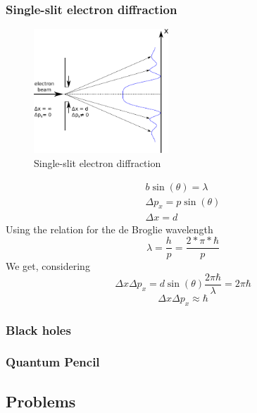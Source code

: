		\subsubsection{Single-slit electron diffraction}
			\begin{figure}[!h]
				\centering
				\includegraphics[width=0.45\textwidth]{./figs/ElectronDiffraction.eps}
				\caption{Single-slit electron diffraction}
				\label{electrondiffrac}
			\end{figure}
			
			\begin{align}
				b \sin(\theta) = \lambda \\
				\Delta p_x = p \sin(\theta) \\
				\Delta x = d
			\end{align}
			Using the relation for the de Broglie wavelength
			\begin{equation}
				\lambda = \frac{h}{p} = \frac{2*\pi *\hbar}{p}
			\end{equation}
			We get, considering
			\begin{equation}
				\Delta x \Delta p_x = d \sin(\theta) \frac{2\pi\hbar}{\lambda} = 2 \pi \hbar
			\end{equation}
			\begin{equation}
				\Delta x \Delta p_x \approx \hbar
			\end{equation}
			
		\subsubsection{Black holes}
		\subsubsection{Quantum Pencil}
			\cite{easton2007quantum}
		
	\subsection{Problems}